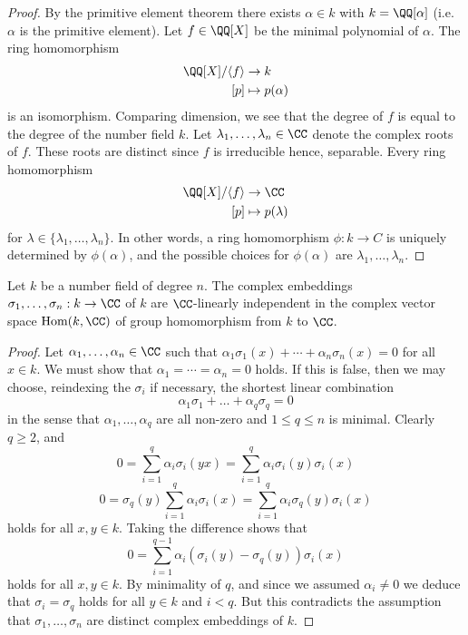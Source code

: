 \documentclass[12pt, a4paper]{article}
\begin{document}
\begin{proof}
    By the primitive element theorem there exists \(\alpha \in k\) with \(k=\QQ[\alpha]\) (i.e. \(\alpha\) is the primitive element). Let \(f\in \QQ[X]\) be the minimal polynomial of \(\alpha\). The ring homomorphism
    \[\begin{aligned}
        \QQ[X]/\langle f\rangle &\to k \\
        [p] &\mapsto p(\alpha)
    \end{aligned}\]
    is an isomorphism. Comparing dimension, we see that the degree of \(f\) is equal to the degree of the number field \(k\). Let \(\lambda_1,\ldots,\lambda_n \in \CC\) denote the complex roots of \(f\). These roots are distinct since \(f\) is irreducible hence, separable. Every ring homomorphism
    \[\begin{aligned}
        \QQ[X]/\langle f\rangle &\to \CC \\
        [p] &\mapsto p(\lambda)
    \end{aligned}\]
    for \(\lambda\in \{\lambda_1,\ldots,\lambda_n\}\). In other words, a ring homomorphism \(\phi:k\to C\) is uniquely determined by \(\phi(\alpha)\), and the possible choices for \(\phi(\alpha)\) are \(\lambda_1,\ldots,\lambda_n\).
\end{proof}

\begin{mdlemma}[Dedekind]
    Let \(k\) be a number field of degree \(n\). The complex embeddings \(\sigma_1,\ldots,\sigma_n : k \to \CC\) of \(k\) are \(\CC\)-linearly independent in the complex vector space \(\text{Hom}(k,\CC)\) of group homomorphism from \(k\) to \(\CC\).
\end{mdlemma}

\begin{proof}
    Let \(\alpha_1,\ldots,\alpha_n \in \CC\) such that \(\alpha_1\sigma_1(x)+\cdots+\alpha_n\sigma_n(x)=0\) for all \(x\in k\). We must show that \(\alpha_1=\cdots=\alpha_n=0\) holds. If this is false, then we may choose, reindexing 
    the \(\sigma_i\) if necessary, the shortest linear combination
\[
\alpha_1\sigma_1 + \ldots + \alpha_q\sigma_q = 0
\]
in the sense that \(\alpha_1, \ldots, \alpha_q\) are all non-zero and \(1 \leq q \leq n\) is minimal. Clearly \(q \geq 2\), and
\[
0 = \sum_{i=1}^{q} \alpha_i\sigma_i(yx) = \sum_{i=1}^{q} \alpha_i\sigma_i(y)\sigma_i(x)
\]
\[
0 = \sigma_q(y) \sum_{i=1}^{q} \alpha_i\sigma_i(x) = \sum_{i=1}^{q} \alpha_i\sigma_q(y)\sigma_i(x)
\]
holds for all \(x, y \in k\). Taking the difference shows that
\[
0 = \sum_{i=1}^{q-1} \alpha_i(\sigma_i(y) - \sigma_q(y))\sigma_i(x)
\]
holds for all \(x, y \in k\). By minimality of \(q\), and since we assumed \(\alpha_i \neq 0\) we deduce that \(\sigma_i = \sigma_q\) holds for all \(y \in k\) and \(i < q\). But this contradicts the assumption that \(\sigma_1, \ldots, \sigma_n\) are distinct complex embeddings of \(k\).

\end{proof}
\end{document}
